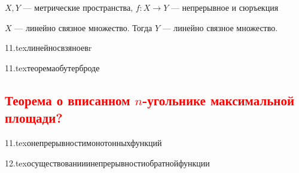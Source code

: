 $X, Y$ --- метрические пространства, $f:X\to Y$ --- непрерывное и сюръекция

$X$ --- линейно связное множество. Тогда $Y$ --- линейно связное множество.

{11.tex}{линейносвзяноевr}

{11.tex}{теоремаобутерброде}

\subsection{\textcolor{red}{Теорема о вписанном $n$-угольнике максимальной площади?}}

{11.tex}{онепрерывностимонотонныхфункций}


{12.tex}{осуществованииинепрерывностиобратнойфункции}

